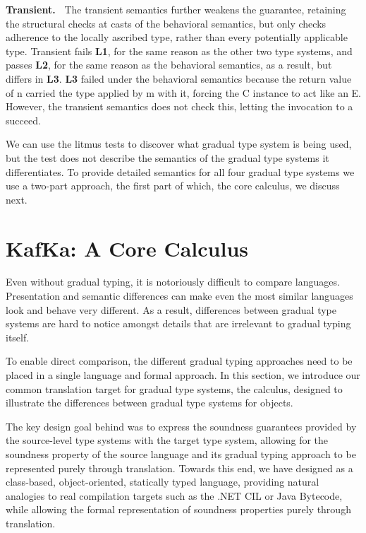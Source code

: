 \documentclass[USenglish]{tex/lipics-v2016}
\begin{document}
{\bf Transient.~} The transient semantics further weakens the guarantee,
retaining the structural checks at casts of the behavioral semantics, but
only checks adherence to the locally ascribed type, rather than every
potentially applicable type. Transient fails {\bf L1}, for the same reason
as the other two type systems, and passes {\bf L2}, for the same reason as
the behavioral semantics, as a result, but differs in {\bf L3}. {\bf L3}
failed under the behavioral semantics because the return value of \xt n
carried the type applied by \xt m with it, forcing the \xt C instance to act
like an \xt E.  However, the transient semantics does not check this,
letting the invocation to \xt a succeed.

We can use the litmus tests to discover what gradual type system is being
used, but the test does not describe the semantics of the gradual type
systems it differentiates. To provide detailed semantics for all four
gradual type systems we use a two-part approach, the first part of which,
the \kafka core calculus, we discuss next.


\section{KafKa: A Core Calculus}\label{kafkacore}

\noindent Even without gradual typing, it is notoriously difficult to compare
languages. Presentation and semantic differences can make even the most similar
languages look and behave very different. As a result, differences between gradual type
systems are hard to notice amongst details that are irrelevant to gradual typing itself.

To enable direct comparison, the different gradual typing approaches need to
be placed in a single language and formal approach. In this section, we
introduce our common translation target for gradual type systems, the \kafka
calculus, designed to illustrate the differences between gradual type systems
for objects.

The key design goal behind \kafka was to express the soundness guarantees
provided by the source-level type systems with the target type system,
allowing for the soundness property of the source language and its gradual
typing approach to be represented purely through translation. Towards this
end, we have designed \kafka as a class-based, object-oriented, statically
typed language, providing natural analogies to real compilation targets such
as the .NET CIL or Java Bytecode, while allowing the formal representation of
soundness properties purely through translation.
\end{document}
